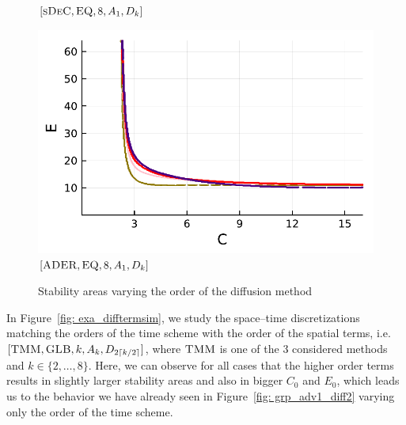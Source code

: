 \begin{figure}[!h]
\begin{minipage}[t]{0.32\textwidth}
		\centering
		$[\textsc{sDeC},\textsc{EQ}, 8, A_1,D_k]$
	\end{minipage}
	\begin{minipage}[t]{0.32\textwidth}
		\includegraphics[width=\textwidth]{pdf/pdepics/diff/IMEXADER_gaussLobatto_diff_ord_2468.pdf}
		\centering
		$[\textsc{ADER},\textsc{EQ}, 8, A_1,D_k]$
	\end{minipage}
	\caption{Stability areas varying the order of the diffusion method}
	\label{fig: exa_diffterm}
\end{figure}
In Figure~\ref{fig: exa_difftermsim}, we study the space--time discretizations matching the orders of the time scheme with the order of the spatial terms, i.e.  $[\textsc{TMM},\textsc{GLB}, k, A_k,D_{2\lceil k/2 \rceil}]$, where $\textsc{TMM}$ is one of the 3 considered methods and $k \in \{2, \hdots, 8\}$.
Here, we can observe for all cases that the higher order terms results in slightly larger stability areas and also in bigger $C_0$ and $E_0$, which leads us to the behavior we have already seen in Figure~\ref{fig: grp_adv1_diff2} varying only the order of the time scheme. 

